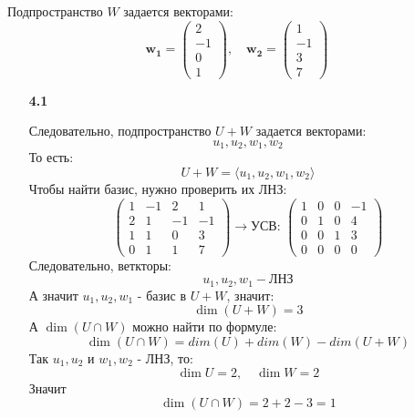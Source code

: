 \documentclass[a4paper]{article}
\begin{document}
\begin{enumerate}
    Подпространство $ W $ задается векторами:
    $$
    \mathbf{w_1} = \begin{pmatrix} 2 \\ -1 \\ 0 \\ 1 \end{pmatrix}, \quad \mathbf{w_2} = \begin{pmatrix} 1 \\ -1 \\ 3 \\ 7 \end{pmatrix}
    $$
    \begin{enumerate}
        \item[\textbf{4.1}]
        
        Следовательно, подпространство $U+W$ задается векторами:
        $$u_1, u_2, w_1, w_2$$
        То есть:
        $$U+W = \langle u_1, u_2, w_1, w_2 \rangle$$
        Чтобы найти базис, нужно проверить их ЛНЗ:
        $$\begin{pmatrix} 1 & -1 & 2 & 1\\ 2 & 1 & -1 & -1\\ 1 & 1 & 0 & 3 \\ 0 & 1 & 1 & 7\end{pmatrix} \to \text{УСВ: }\begin{pmatrix} 1 & 0 & 0 & -1 \\ 0 & 1 & 0 & 4 \\ 0 & 0 & 1 & 3 \\ 0 & 0 & 0 & 0 \end{pmatrix}$$
        Следовательно, веткторы:
        $$u_1, u_2, w_1 - \text{ЛНЗ}$$
        А значит $u_1, u_2, w_1$ - базис в $U+W$, значит:
        $$\dim{(U+W)} = 3$$
        А $\dim(U \cap W)$ можно найти по формуле:
        $$\dim(U \cap W) = dim(U)+dim(W)-dim(U+W)$$
        Так $u_1, u_2$ и $w_1, w_2$ - ЛНЗ, то:
        $$\dim U = 2, \quad \dim W = 2$$
        Значит 
        $$\dim(U \cap W) = 2+2 -3 = 1$$


\end{enumerate}
\end{enumerate}
\end{document}
